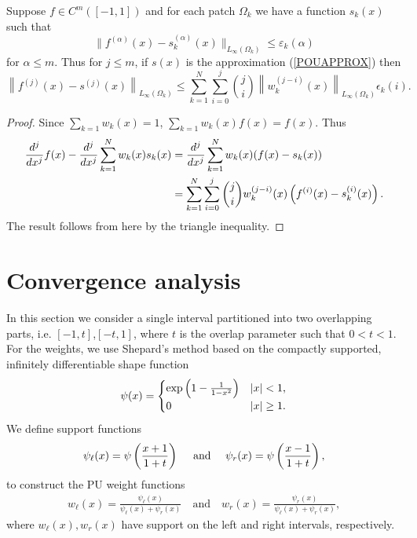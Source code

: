 \begin{thm}
\label{PUMCON}
Suppose $f \in C^{m}([-1,1])$ and for each patch $\Omega_k$ we have a function $s_k(x)$ such that
$$ \|f^{(\alpha)}(x)-s_k^{(\alpha)}(x)\|_{L_{\infty}(\Omega_k)} \leq \varepsilon_k(\alpha) $$
for $\alpha \leq m$. Thus for $j\leq m$, if $s(x)$ is the approximation (\ref{POUAPPROX}) then
\begin{equation}
\left \|f^{(j)}(x)- s^{(j)}(x) \right \|_{L_{\infty}(\Omega_k)} \leq \sum_{k=1}^N\sum_{i=0}^j \binom{j}{i} \left \| w_k^{(j-i)}(x) \right \|_{L_{\infty}(\Omega_k)} \epsilon_k(i).
\end{equation}
\end{thm}
\begin{proof}
Since $\sum_{k=1} w_k(x)=1$, $\sum_{k=1} w_k(x)f(x)=f(x)$. Thus
\begin{equation}
\begin{aligned}
\frac{d^{j}}{d x^j}f(x)-\frac{d^{j}}{d x^j} \sum_{k=1}^N w_k(x)s_k(x) &= \frac{d^{j}}{d x^j} \sum_{k=1}^N w_k(x)(f(x)-s_k(x)) \\
&= \sum_{k=1}^N\sum_{i=0}^j \binom{j}{i} w_k^{(j-i)}(x) \left( f^{(i)}(x)-s_k^{(i)}(x) \right).
\end{aligned}
\end{equation}
The result follows from here by the triangle inequality.
\end{proof}


\section{Convergence analysis}
\label{converge_sec}
In this section we consider a single interval partitioned into two overlapping parts, i.e.
$[-1,t]$,$[-t,1]$, where $t$ is the overlap parameter such that $0<t<1$. For the weights, we use Shepard's method \cite{shepard1968two} based on the compactly supported, infinitely differentiable shape function
\begin{align}
\psi(x) = \begin{cases}
\exp \left(  1 - \frac{1}{1-x^2}\right) & |x| < 1, \\
0 & |x| \geq 1.
\end{cases}
\end{align}
We define support functions
\begin{align}
\psi_{\ell}(x) = \psi \left( \frac{x+1}{1+t} \right) \quad \text{ and } \quad \psi_{r}(x) = \psi \left( \frac{x-1}{1+t} \right) ,
\end{align}
to construct the PU weight functions
\begin{align}
w_{\ell}(x) = \frac{\psi_{\ell}(x)}{\psi_{\ell}(x)+\psi_{r}(x)} \quad \text{and} \quad w_{r}(x) = \frac{\psi_{r}(x)}{\psi_{\ell}(x)+\psi_{r}(x)},
\label{PUW}
\end{align}
where $w_{\ell}(x),w_{r}(x)$ have support on the left and right intervals, respectively.

